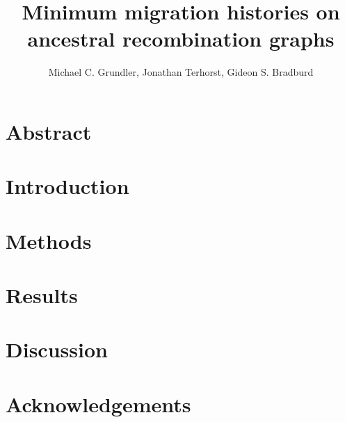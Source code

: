 \documentclass[12pt, letterpaper]{article}
\title{Minimum migration histories on ancestral recombination graphs}
\date{}
\author{Michael C. Grundler, Jonathan Terhorst, Gideon S. Bradburd}
\begin{document}
\maketitle

\begin{linenumbers}

\section*{Abstract}


\section{Introduction}


\section{Methods}


\section{Results}


\section{Discussion}


\section*{Acknowledgements}






\end{linenumbers}
\end{document}
